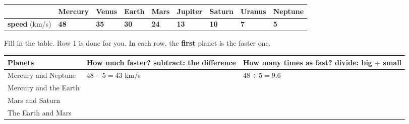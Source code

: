 \documentclass[12pt,a4paper]{article}
\newif\iffr
\newcommand{\fr}[1]{\unskip\iffr\par\vspace{1pt}\noindent{\small\itshape\color{black!60}#1}\par\fi}
\newcommand{\tallen}{\rule[-0.6em]{0pt}{1.9em}}
\newcommand{\frl}[2]{\iffr#2\else#1\fi}
\begin{document}

\noindent\begin{minipage}{\textwidth}
\vspace{2pt}
{\centering
\setlength{\tabcolsep}{3pt}%
\begin{tabular}{|l|*{8}{C{1.50cm}|}}
  \hline
  & \small Mercury & \small Venus & \small Earth & \small Mars & \small Jupiter &
  \small Saturn & \small Uranus & \small Neptune \\
  \hline
  \textbf{speed} (km/s) & \textbf{48} & \textbf{35} & \textbf{30} & \textbf{24} &
  \textbf{13} & \textbf{10} & \textbf{7} & \textbf{5} \\
  \hline
\end{tabular}\par}

\vspace{\frl{10pt}{6pt}}
\noindent Fill in the table. Row 1 is done for you. In each row, the
\textbf{first} planet is the faster one.
\fr{Compl\`ete le tableau (la premi\`ere ligne est faite). Dans chaque ligne, la
premi\`ere plan\`ete est la plus rapide. \eng{subtract} = soustraire~; \eng{divide}
= diviser.}

\vspace{4pt}
\noindent
\begin{tabularx}{\textwidth}{|L|C{4.9cm}|C{4.9cm}|}
  \hline
  \textbf{Planets} & \textbf{How much faster?} \newline
    {\small\color{cbblue}\textbf{subtract}: the difference}
  & \textbf{How many times as fast?} \newline
    {\small\color{cbblue}\textbf{divide}: big $\div$ small} \\ \hline
  Mercury and Neptune \tallen & $48 - 5 = 43$ km/s & $48 \div 5 = 9.6$ \\ \hline
  Mercury and the Earth \tallen & & \\ \hline
  Mars and Saturn \tallen & & \\ \hline
  The Earth and Mars \tallen & & \\ \hline
\end{tabularx}
\end{minipage}
\end{document}
